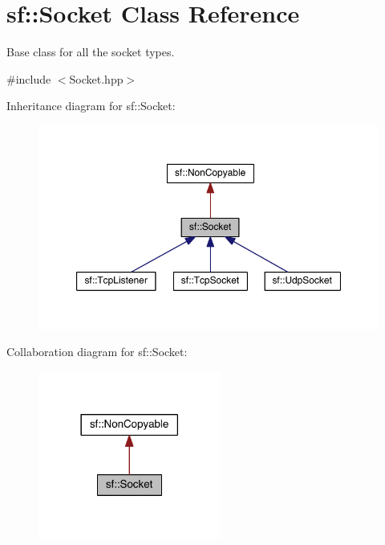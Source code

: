 \hypertarget{classsf_1_1_socket}{\section{sf\-:\-:Socket Class Reference}
\label{classsf_1_1_socket}
}


Base class for all the socket types.  




{\ttfamily \#include $<$Socket.\-hpp$>$}



Inheritance diagram for sf\-:\-:Socket\-:
\nopagebreak
\begin{figure}[H]
\begin{center}
\leavevmode
\includegraphics[width=350pt]{classsf_1_1_socket__inherit__graph}
\end{center}
\end{figure}


Collaboration diagram for sf\-:\-:Socket\-:
\nopagebreak
\begin{figure}[H]
\begin{center}
\leavevmode
\includegraphics[width=170pt]{classsf_1_1_socket__coll__graph}
\end{center}
\end{figure}
